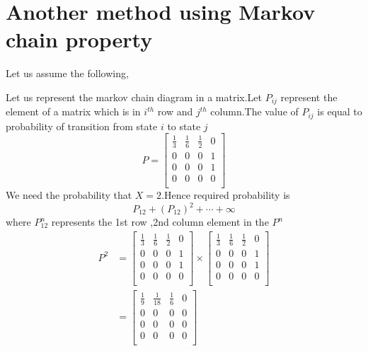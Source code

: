 \documentclass[journal,12pt,twocolumn]{IEEEtran}
\begin{document}
\section{Another method using Markov chain property}
Let us assume the following,
\begin{table}[h]
\centering
\caption{}
\label{table:1}
\end{table}
Let us represent the markov chain diagram in a matrix.Let $P_{ij}$ represent the element of a matrix which is in $i^{th}$ row and $j^{th}$ column.The value of $P_{ij}$ is equal to probability of transition from state $i$ to state $j$
\begin{equation}
P=\begin{bmatrix}
\frac{1}{3}&\frac{1}{6}&\frac{1}{2}&0\\
0&0&0&1\\
0&0&0&1\\
0&0&0&0\\
\end{bmatrix}
\end{equation}
We need the probability that $X=2$.Hence required probability is
\begin{equation}
    P_{12}+(P_{12})^{2}+\cdots+\infty \label{eq:reqprob}
\end{equation}
where $P_{12}^{n}$ represents the 1st row ,2nd column element in the $P^{n}$
\begin{align}
P^2&=\begin{bmatrix}
\frac{1}{3}&\frac{1}{6}&\frac{1}{2}&0\\
0&0&0&1\\
0&0&0&1\\
0&0&0&0\\
\end{bmatrix} \times
\begin{bmatrix}
\frac{1}{3}&\frac{1}{6}&\frac{1}{2}&0\\
0&0&0&1\\
0&0&0&1\\
0&0&0&0\\
\end{bmatrix}\\
&=\begin{bmatrix}
\frac{1}{9}&\frac{1}{18}&\frac{1}{6}&0\\
0&0&0&0\\
0&0&0&0\\
0&0&0&0\\
\end{bmatrix}
\end{align}
\end{document}
